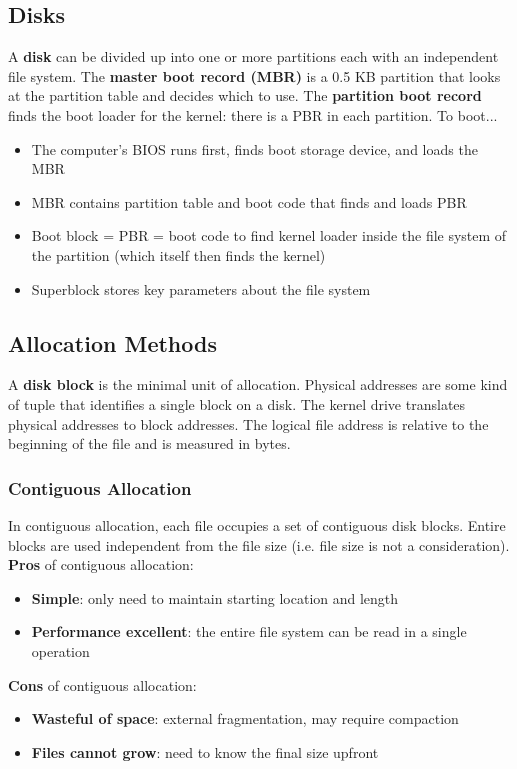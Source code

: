 \documentclass{article}
\newcommand{\bold}[1]{\textbf{#1}}
\renewcommand{\b}{\item[$\circ$]}
\newcommand{\newlist}{\begin{itemize}}
\renewcommand{\endlist}{\end{itemize}}
\begin{document}
\subsection{Disks}

A \bold{disk} can be divided up into one or more partitions each with an independent file system. The \bold{master boot record (MBR)} is a 0.5 KB partition that looks at the partition table and decides which to use. The \bold{partition boot record} finds the boot loader for the kernel: there is a PBR in each partition. To boot...

\newlist 
\b The computer's BIOS runs first, finds boot storage device, and loads the MBR
\b MBR contains partition table and boot code that finds and loads PBR
\b Boot block = PBR = boot code to find kernel loader inside the file system of the partition (which itself then finds the kernel) 
\b Superblock stores key parameters about the file system
\endlist 

\subsection{Allocation Methods}

A \bold{disk block} is the minimal unit of allocation. Physical addresses are some kind of tuple that identifies a single block on a disk. The kernel drive translates physical addresses to block addresses. The logical file address is relative to the beginning of the file and is measured in bytes. 

\subsubsection{Contiguous Allocation}

In contiguous allocation, each file occupies a set of contiguous disk blocks. Entire blocks are used independent from the file size (i.e. file size is not a consideration). \\ 

\bold{Pros} of contiguous allocation:

\newlist 
\b \bold{Simple}: only need to maintain starting location and length
\b \bold{Performance excellent}: the entire file system can be read in a single operation
\endlist 

\bold{Cons} of contiguous allocation:

\newlist 
\b \bold{Wasteful of space}: external fragmentation, may require compaction
\b \bold{Files cannot grow}: need to know the final size upfront
\endlist 
\end{document}
